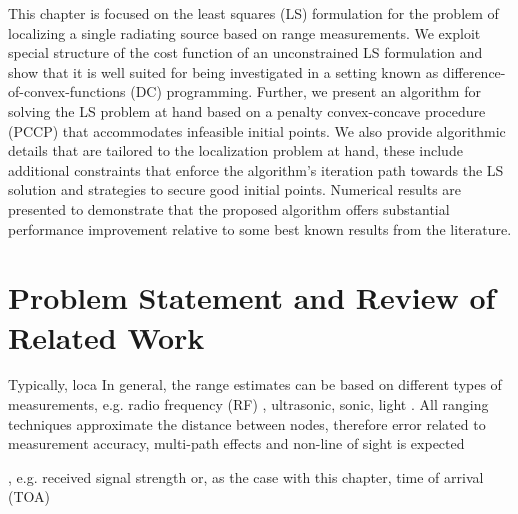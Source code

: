 \label{chapter:pccp}


%
%
%
%
%
%
%


This chapter is focused on the least squares (LS) formulation for the problem of localizing a single radiating source based on range measurements.   We exploit special structure of the cost function of an unconstrained LS formulation and show that it is well suited for being investigated in a setting known as difference-of-convex-functions (DC) programming. Further, we present an algorithm for solving the LS problem at hand based on a penalty convex-concave procedure (PCCP) \cite{LBoyd} that accommodates infeasible initial points. We also provide algorithmic details that are tailored to the localization problem at hand, these include additional constraints that enforce the algorithm’s  iteration path towards the LS solution and strategies to secure good initial points. %
Numerical results are presented to demonstrate that the proposed algorithm offers substantial performance improvement relative to some best known results from the literature.


\section{Problem Statement and Review of Related Work}%

Typically, loca
In general, the range estimates can be based on different types of measurements, e.g. radio frequency (RF) , ultrasonic, sonic, light \cite{new book}. All ranging techniques approximate the distance between nodes, therefore error related to measurement accuracy, multi-path effects and non-line of sight is expected \cite{new book}


 \cite{UWB}, e.g. received signal strength or, as the case with this chapter, time of arrival (TOA)



